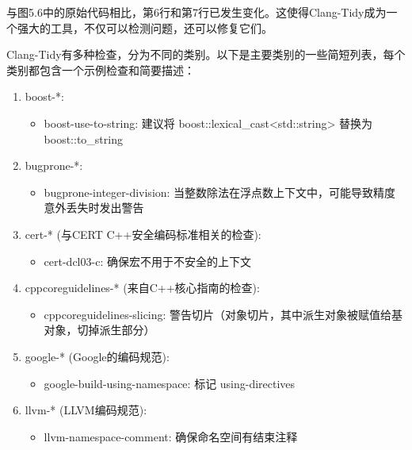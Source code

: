 与图5.6中的原始代码相比，第6行和第7行已发生变化。这使得Clang-Tidy成为一个强大的工具，不仅可以检测问题，还可以修复它们。


Clang-Tidy有多种检查，分为不同的类别。以下是主要类别的一些简短列表，每个类别都包含一个示例检查和简要描述：


\begin{enumerate}
\item
boost-*:

\begin{itemize}
\item
boost-use-to-string: 建议将 boost::lexical\_cast<std::string> 替换为 boost::to\_string
\end{itemize}

\item
bugprone-*:

\begin{itemize}
\item
bugprone-integer-division: 当整数除法在浮点数上下文中，可能导致精度意外丢失时发出警告
\end{itemize}

\item
cert-* (与CERT C++安全编码标准相关的检查):

\begin{itemize}
\item
cert-dcl03-c: 确保宏不用于不安全的上下文
\end{itemize}

\item
cppcoreguidelines-* (来自C++核心指南的检查):

\begin{itemize}
\item
cppcoreguidelines-slicing: 警告切片（对象切片，其中派生对象被赋值给基对象，切掉派生部分）
\end{itemize}

\item
google-* (Google的编码规范):

\begin{itemize}
\item
google-build-using-namespace: 标记 using-directives
\end{itemize}

\item
llvm-* (LLVM编码规范):

\begin{itemize}
\item
llvm-namespace-comment: 确保命名空间有结束注释
\end{itemize}


\end{enumerate}
